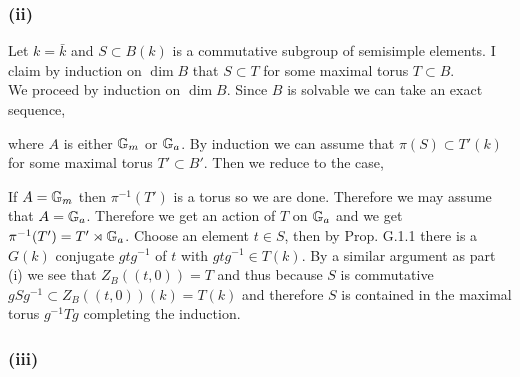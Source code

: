 \documentclass[12pt]{article}
\begin{document}
\subsubsection{(ii)}

Let $k = \bar{k}$ and $S \subset B(k)$ is a commutative subgroup of semisimple elements. I claim by induction on $\dim{B}$ that $S \subset T$ for some maximal torus $T \subset B$. 
\bigskip\\
We proceed by induction on $\dim{B}$. Since $B$ is solvable we can take an exact sequence,
\begin{center}
\end{center}
where $A$ is either $\mathbb{G}_m$ or $\mathbb{G}_a$. By induction we can assume that $\pi(S) \subset T'(k)$ for some maximal torus $T' \subset B'$. Then we reduce to the case,
\begin{center}
\end{center}
If $A = \mathbb{G}_m$ then $\pi^{-1}(T')$ is a torus so we are done. Therefore we may assume that $A = \mathbb{G}_a$. Therefore we get an action of $T$ on $\mathbb{G}_a$ and we get $\pi^{-1}(T') = T' \rtimes \mathbb{G}_a$. Choose an element $t \in S$, then by Prop. G.1.1 there is a $G(k)$ conjugate $g t g^{-1}$ of $t$ with $g t g^{-1} \in T(k)$. By a similar argument as part (i) we see that $Z_B((t, 0)) = T$ and thus because $S$ is commutative $g S g^{-1} \subset Z_B((t, 0))(k) = T(k)$ and therefore $S$ is contained in the maximal torus $g^{-1} T g$ completing the induction.


\subsubsection{(iii)}
\end{document}
